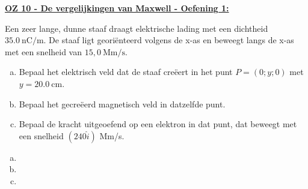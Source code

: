 \textbf{\underline{OZ 10 - De vergelijkingen van Maxwell - Oefening 1:}}
\vspace{0.5cm}

Een zeer lange, dunne staaf draagt elektrische lading met een dichtheid $35.0 \ \text{nC/m}$. De staaf ligt georiënteerd volgens de x-as en beweegt langs de x-as met een snelheid van $15,0 \ \text{Mm/s}$.

\begin{enumerate}[(a)]
    \item Bepaal het elektrisch veld dat de staaf creëert in het punt $P = (0; y; 0)$ met $y = 20.0 \ \text{cm}$.
    \item Bepaal het gecreëerd magnetisch veld in datzelfde punt.
    \item Bepaal de kracht uitgeoefend op een elektron in dat punt, dat beweegt met een snelheid $(240\hat{i})$ Mm/s.
\end{enumerate}

\begin{enumerate}[(a)]
    \item 
        \begin{description}[labelwidth=1.5cm, leftmargin=!]
            \item[Geg. :]   
            \item[Gevr. :] 
            \item[Opl. :]   
        \end{description}
    \item
        \begin{description}[labelwidth=1.5cm, leftmargin=!]
            \item[Geg. :]   
            \item[Gevr. :] 
            \item[Opl. :]   
        \end{description}
    \item
        \begin{description}[labelwidth=1.5cm, leftmargin=!]
            \item[Geg. :]   
            \item[Gevr. :] 
            \item[Opl. :]   
        \end{description}
\end{enumerate}



\vspace{1cm}